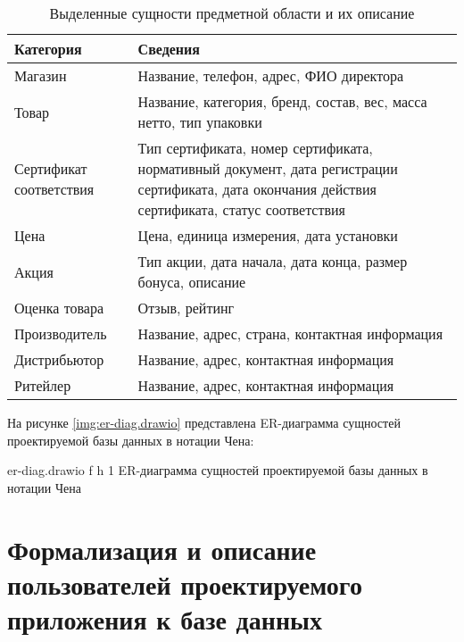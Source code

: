 \begin{table}[ht]
	\begin{center}
		\begin{threeparttable}
			\caption{Выделенные сущности предметной области и их описание}
			\label{tbl:db_entities}
			\begin{tabular}{|p{4.5cm}|p{10cm}|}
				\hline
				\textbf{Категория} & \textbf{Сведения} \\ \hline
				Магазин & Название, телефон, адрес, ФИО директора \\ 
				\hline
				Товар & Название, категория, бренд, состав, вес, масса нетто, тип упаковки \\ 
				\hline
				Сертификат соответствия & Тип сертификата, номер сертификата, нормативный документ, дата регистрации сертификата, дата окончания действия сертификата, статус соответствия \\ 
				\hline
				Цена & Цена, единица измерения, дата установки  \\ 
				\hline
				Акция & Тип акции, дата начала, дата конца, размер бонуса, описание \\ 
				\hline
				Оценка товара & Отзыв, рейтинг \\ 
				\hline
				Производитель & Название, адрес, страна, контактная информация \\ 
				\hline
				Дистрибьютор & Название, адрес, контактная информация \\ 
				\hline
				Ритейлер & Название, адрес, контактная информация \\ 
				\hline
			\end{tabular}
		\end{threeparttable}
	\end{center}
\end{table}

\clearpage

На рисунке \ref{img:er-diag.drawio} представлена ER-диаграмма сущностей проектируемой базы данных в нотации Чена:

{er-diag.drawio} %
{f} %
{h} %
{1\textwidth} %
{ER-диаграмма сущностей проектируемой базы данных в нотации Чена} %

\section{Формализация и описание пользователей проектируемого приложения к базе данных}


